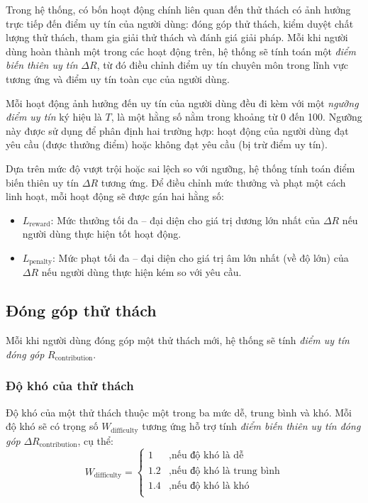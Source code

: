 Trong hệ thống, có bốn hoạt động chính liên quan đến thử thách có ảnh hưởng trực tiếp đến điểm uy tín của người dùng: đóng góp thử thách, kiểm duyệt chất lượng thử thách, tham gia giải thử thách và đánh giá giải pháp.
Mỗi khi người dùng hoàn thành một trong các hoạt động trên, hệ thống sẽ tính toán một \textit{điểm biến thiên uy tín} $\Delta R$, từ đó điều chỉnh điểm uy tín chuyên môn trong lĩnh vực tương ứng và điểm uy tín toàn cục của người dùng.

Mỗi hoạt động ảnh hưởng đến uy tín của người dùng đều đi kèm với một \textit{ngưỡng điểm uy tín} ký hiệu là $T$, là một hằng số nằm trong khoảng từ 0 đến 100.
Ngưỡng này được sử dụng để phân định hai trường hợp: hoạt động của người dùng đạt yêu cầu (được thưởng điểm) hoặc không đạt yêu cầu (bị trừ điểm uy tín).

Dựa trên mức độ vượt trội hoặc sai lệch so với ngưỡng, hệ thống tính toán điểm biến thiên uy tín $\Delta R$ tương ứng. Để điều chỉnh mức thưởng và phạt một cách linh hoạt, mỗi hoạt động sẽ được gán hai hằng số:
\begin{itemize}
  \item $L_{\text{reward}}$: Mức thưởng tối đa -- đại diện cho giá trị dương lớn nhất của $\Delta R$ nếu người dùng thực hiện tốt hoạt động.
  \item $L_{\text{penalty}}$: Mức phạt tối đa -- đại diện cho giá trị âm lớn nhất (về độ lớn) của $\Delta R$ nếu người dùng thực hiện kém so với yêu cầu.
\end{itemize}

\subsection{Đóng góp thử thách}

Mỗi khi người dùng đóng góp một thử thách mới, hệ thống sẽ tính \textit{điểm uy tín đóng góp} $R_{\text{contribution}}$.

\subsubsection{Độ khó của thử thách}

Độ khó của một thử thách thuộc một trong ba mức dễ, trung bình và khó. Mỗi độ khó sẽ có trọng số $W_{\text{difficulty}}$ tương ứng hỗ trợ tính \textit{điểm biến thiên uy tín đóng góp} $\Delta R_{\text{contribution}}$, cụ thể:
\[
  W_{\text{difficulty}} =
  \begin{cases}
    1   & , \text{nếu độ khó là dễ}         \\
    1.2 & , \text{nếu độ khó là trung bình} \\
    1.4 & , \text{nếu độ khó là khó}        \\
  \end{cases}
\]

